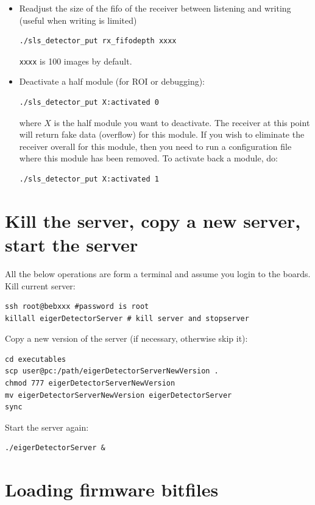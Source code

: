 \documentclass{article}
\begin{document}
\begin{itemize}
\item Readjust the size of the fifo of the receiver between listening and writing (useful when writing is limited)
\begin{verbatim}
./sls_detector_put rx_fifodepth xxxx
\end{verbatim}
 {\tt{xxxx}} is 100 images by default.
\item Deactivate a half module (for ROI or debugging):
\begin{verbatim}
./sls_detector_put X:activated 0 
\end{verbatim}
where $X$ is the half module you want to deactivate.
The receiver at this point will return fake data (overflow) for this module. If you wish to eliminate the receiver overall for this module, then you need to run a configuration file where this module has been removed.
To activate back a module, do:
\begin{verbatim}
./sls_detector_put X:activated 1
\end{verbatim}

\end{itemize}

\appendix

\section{Kill the server, copy a new server, start the server}
All the below operations are form a terminal and assume you login to the boards.\\
Kill current server:
\begin{verbatim}
ssh root@bebxxx #password is root
killall eigerDetectorServer # kill server and stopserver
\end{verbatim}
Copy a new version of the server (if necessary, otherwise skip it):
\begin{verbatim}
cd executables
scp user@pc:/path/eigerDetectorServerNewVersion .
chmod 777 eigerDetectorServerNewVersion
mv eigerDetectorServerNewVersion eigerDetectorServer
sync
\end{verbatim}
Start the server again:
\begin{verbatim}
./eigerDetectorServer &
\end{verbatim}


\section{Loading firmware bitfiles}
\end{document}
